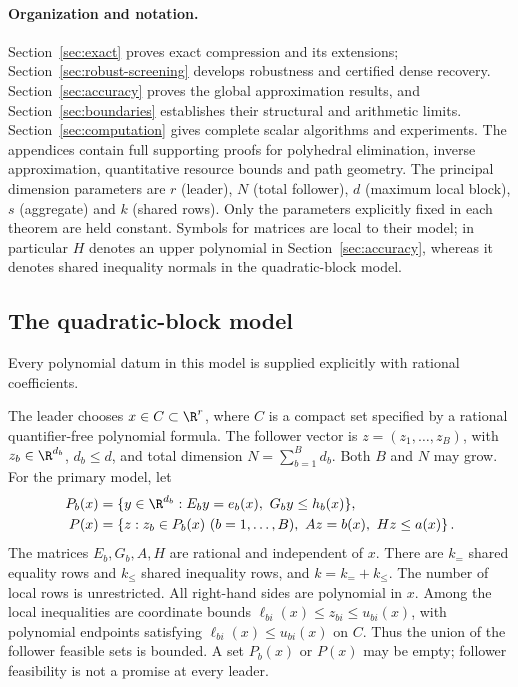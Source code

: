 \paragraph{Organization and notation.}
Section~\ref{sec:exact} proves exact compression and its extensions;
Section~\ref{sec:robust-screening} develops robustness and certified dense
recovery. Section~\ref{sec:accuracy} proves the global approximation results,
and Section~\ref{sec:boundaries} establishes their structural and arithmetic
limits. Section~\ref{sec:computation} gives complete scalar algorithms and
experiments. The appendices contain full supporting proofs for polyhedral
elimination, inverse approximation, quantitative resource bounds and path
geometry. The principal dimension parameters are $r$ (leader), $N$ (total
follower), $d$ (maximum local block), $s$ (aggregate) and $k$ (shared rows).
Only the parameters explicitly fixed in each theorem are held constant.
Symbols for matrices are local to their model; in particular $H$ denotes an
upper polynomial in Section~\ref{sec:accuracy}, whereas it denotes shared
inequality normals in the quadratic-block model.

\subsection{The quadratic-block model}\label{subsec:model}

Every polynomial datum in this model is supplied explicitly with rational
coefficients.

The leader chooses $x\in C\subset\R^r$, where $C$ is a compact set
specified by a rational quantifier-free polynomial formula. The follower
vector is $z=(z_1,\ldots,z_B)$, with $z_b\in\R^{d_b}$,
$d_b\le d$, and total dimension $N=\sum_{b=1}^B d_b$. Both $B$ and $N$
may grow. For the primary model, let
\begin{align}
 P_b(x)&=\{y\in\R^{d_b}:E_b y=e_b(x),\ G_b y\le h_b(x)\},
 \label{eq:local-polytope}\\
 P(x)&=\left\{z:z_b\in P_b(x)\ (b=1,\ldots,B),\
                     Az=b(x),\ Hz\le a(x)\right\}.
 \label{eq:follower-polytope}
\end{align}
The matrices $E_b,G_b,A,H$ are rational and independent of $x$.
There are $k_{=}$ shared equality rows and $k_{\le}$ shared inequality
rows, and $k=k_=+k_{\le}$. The number of local rows is unrestricted.
All right-hand sides are polynomial in $x$. Among the local inequalities
are coordinate bounds
$\ell_{bi}(x)\le z_{bi}\le u_{bi}(x)$, with polynomial endpoints
satisfying $\ell_{bi}(x)\le u_{bi}(x)$ on $C$.
Thus the union of the follower feasible sets is bounded.
A set $P_b(x)$ or $P(x)$ may be empty; follower feasibility is not a
promise at every leader.

